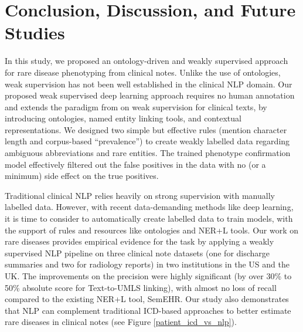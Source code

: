\documentclass[twocolumn]{bmcart}
\begin{document}
\section*{Conclusion, Discussion, and Future Studies}
\label{sec:discussion}

In this study, we proposed an ontology-driven and weakly supervised approach for rare disease phenotyping from clinical notes. Unlike the use of ontologies, weak supervision has not been well established in the clinical NLP domain. Our proposed weak supervised deep learning approach requires no human annotation and extends the paradigm from \cite{wang_clinical_2019} on weak supervision for clinical texts, by introducing ontologies, named entity linking tools, and contextual representations. We designed two simple but effective rules (mention character length and corpus-based ``prevalence'') to create weakly labelled data regarding ambiguous abbreviations and rare entities. The trained phenotype confirmation model effectively filtered out the false positives in the data with no (or a minimum) side effect on the true positives. 

Traditional clinical NLP relies heavily on strong supervision with manually labelled data. However, with recent data-demanding methods like deep learning, it is time to consider to automatically create labelled data to train models, with the support of rules and resources like ontologies and NER+L tools. Our work on rare diseases provides empirical evidence for the task by applying a weakly supervised NLP pipeline on three clinical note datasets (one for discharge summaries and two for radiology reports) in two institutions in the US and the UK. The improvements on the precision were highly significant (by over 30\% to 50\% absolute score for Text-to-UMLS linking), with almost no loss of recall compared to the existing NER+L tool, SemEHR. Our study also demonstrates that NLP can complement traditional ICD-based approaches to better estimate rare diseases in clinical notes (see Figure \ref{patient_icd_vs_nlp}).
\end{document}
